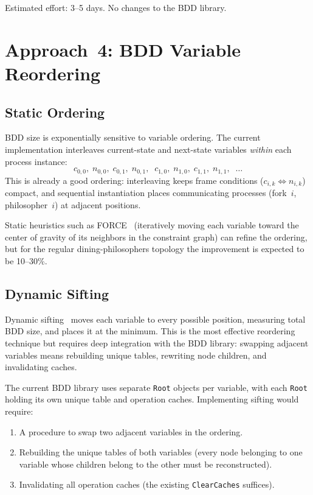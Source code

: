 \documentclass[11pt]{article}
\begin{document}
Estimated effort: 3--5 days.  No changes to the BDD library.

\section{Approach~4: BDD Variable Reordering}

\subsection{Static Ordering}

BDD size is exponentially sensitive to variable ordering.  The current
implementation interleaves current-state and next-state variables
\emph{within} each process instance:
%
\[
  c_{0,0},\; n_{0,0},\; c_{0,1},\; n_{0,1},\;\;
  c_{1,0},\; n_{1,0},\; c_{1,1},\; n_{1,1},\;\;
  \ldots
\]
%
This is already a good ordering: interleaving keeps frame conditions
($c_{i,k} \Leftrightarrow n_{i,k}$) compact, and sequential
instantiation places communicating processes (fork~$i$, philosopher~$i$)
at adjacent positions.

Static heuristics such as FORCE~\cite{force} (iteratively moving each
variable toward the center of gravity of its neighbors in the
constraint graph) can refine the ordering, but for the regular
dining-philosophers topology the improvement is expected to be
10--30\%.

\subsection{Dynamic Sifting}

Dynamic sifting~\cite{rudell1993} moves each variable to every
possible position, measuring total BDD size, and places it at the
minimum.  This is the most effective reordering technique but requires
deep integration with the BDD library: swapping adjacent variables
means rebuilding unique tables, rewriting node children, and
invalidating caches.

The current BDD library uses separate \texttt{Root} objects per
variable, with each \texttt{Root} holding its own unique table and
operation caches.  Implementing sifting would require:
\begin{enumerate}
\item A procedure to swap two adjacent variables in the ordering.
\item Rebuilding the unique tables of both variables (every node
  belonging to one variable whose children belong to the other must
  be reconstructed).
\item Invalidating all operation caches (the existing
  \texttt{ClearCaches} suffices).
\end{enumerate}
\end{document}
